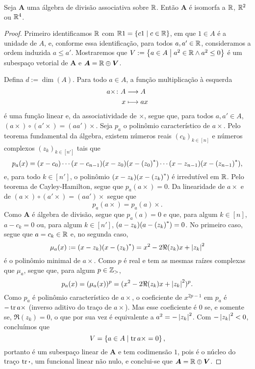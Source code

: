 \begin{proposition}
Seja $\bm A$ uma álgebra de divisão associativa sobre $\mathbb{R}$. Então $\bm A$ é isomorfa a $\mathbb{R}$, $\mathbb{R}^2$ ou $\mathbb{R}^4$.
\end{proposition}
\begin{proof}
Primeiro identificamos $\mathbb{R}$ com $\mathbb{R} 1 = \left\{ c1 \;\middle\vert\; c \in \mathbb{R} \right\}$, em que $1 \in A$ é a unidade de $A$, e, conforme essa identificação, para todos $a,a' \in \mathbb{R}$, consideramos a ordem induzida $a \leq a'$. Mostraremos que $V := \left\{ a \in A \;\middle\vert\; a^2 \in \mathbb{R} \land a^2 \leq 0 \right\}$ é um subespaço vetorial de $\bm A$ e $\bm A = \mathbb{R} \oplus \bm V$.

Defina $d := \dim(A)$. Para todo $a \in A$, a função multiplicação à esquerda
	\begin{align*}
	{a\times}\colon {A} &\longrightarrow {A} \\{x} &\longmapsto ax
	\end{align*}
é uma função linear e, da associatividade de $\times$, segue que, para todos $a,a' \in A$, $(a\times) \circ (a' \times) = (aa')\times$. Seja $p_a$ o polinômio característico de $a\times$. Pelo teorema fundamental da álgebra, existem números reais $(c_k)_{k \in [n]}$ e números complexos $(z_k)_{k \in [n']}$ tais que
	\begin{equation*}
	p_a(x) = (x-c_0) \cdots (x-c_{n-1}) (x-z_0)(x-{(z_0)}^{\ast}) \cdots (x-z_{n-1})(x-{(z_{n-1})}^{\ast}),
	\end{equation*}
e, para todo $k \in [n']$, o polinômio $(x-z_k)(x-{(z_k)}^{\ast})$ é irredutível em $\mathbb{R}$. Pelo teorema de Cayley-Hamilton, segue que $p_a(a\times) = 0$. Da linearidade de $a\times$ e de $(a\times) \circ (a' \times) = (aa')\times$ segue que
	\begin{equation*}
	p_a(a\times) = p_a(a)\times.
	\end{equation*}
Como $\bm A$ é álgebra de divisão, segue que $p_a(a) = 0$ e que, para algum $k \in [n]$, $a-c_k = 0$ ou, para algum $k \in [n']$, $(a-z_k)(a-{(z_k)}^{\ast}) = 0$. No primeiro caso, segue que $a=c_k \in \mathbb{R}$ e, no segunda caso,
	\begin{equation*}
	\mu_a(x) := (x-z_k)(x-{(z_k)}^{\ast}) = x^2 - 2\Re(z_k)x + \left\vert{z_k}\right\vert^2
	\end{equation*}
é o polinômio minimal de $a\times$. Como $p$ é real e tem as mesmas raízes complexas que $\mu_a$, segue que, para algum $p \in \mathbb{Z}_{>}$,
	\begin{equation*}
	p_a(x) = (\mu_a(x))^p = (x^2 - 2\Re(z_k)x + \left\vert{z_k}\right\vert^2)^p.
	\end{equation*}
Como $p_a$ é polinômio característico de $a\times$, o coeficiente de $x^{2p-1}$ em $p_a$ é $-\operatorname{tr}{a\times}$ (inverso aditivo do traço de $a \times$). Mas esse coeficiente é $0$ se, e somente se, $\Re(z_k)=0$, o que por sua vez é equivalente a $a^2 = -\left\vert{z_k}\right\vert^2$. Com $-\left\vert{z_k}\right\vert^2 < 0$, concluímos que
	\begin{equation*}
	V = \left\{ a \in A \;\middle\vert\; \operatorname{tr}{a\times}=0 \right\},
	\end{equation*}
portanto é um subespaço linear de $\bm A$ e tem codimensão $1$, pois é o núcleo do traço $\operatorname{tr}{\bm{\cdot}}$, um funcional linear não nulo, e conclui-se que $\bm A = \mathbb{R} \oplus \bm V$.


\end{proof}

